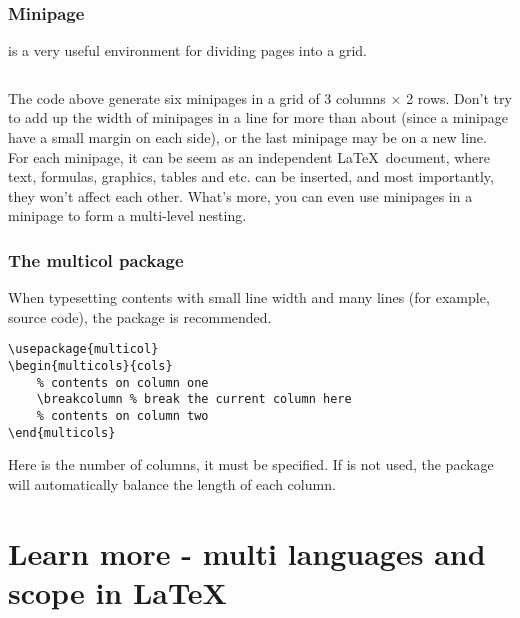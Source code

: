 \begin{frame}[fragile]
	\frametitle{Minipage}
	 is a very useful environment for dividing pages into a grid.
	\begin{example}
		\begin{multicols}{2}
			\inputminted[xleftmargin=1.5em]{latex}{../examples/minipage.tex}
		\end{multicols}
	\end{example}
\end{frame}

\begin{frame}
	The code above generate six minipages in a grid of 3 columns $\times$ 2 rows. Don't try to add up the width of minipages in a line for more than about  (since a minipage have a small margin on each side), or the last minipage may be on a new line. \\[0.5em]
	For each minipage, it can be seem as an independent \LaTeX\ document, where text, formulas, graphics, tables and etc. can be inserted, and most importantly, they won't affect each other. What's more, you can even use minipages in a minipage to form a multi-level nesting. \\
\end{frame}

\begin{frame}[fragile]
	\frametitle{The multicol package}
	When typesetting contents with small line width and many lines (for example, source code), the  package is recommended.
	\begin{command}
		\begin{verbatim}
\usepackage{multicol}
\begin{multicols}{cols}
    % contents on column one
    \breakcolumn % break the current column here
    % contents on column two
\end{multicols}
		\end{verbatim}
	\end{command}
	Here  is the number of columns, it must be specified. If \LC{\breakcolumn} is not used, the  package will automatically balance the length of each column.
\end{frame}

\section{Learn more - multi languages and scope in \LaTeX}

